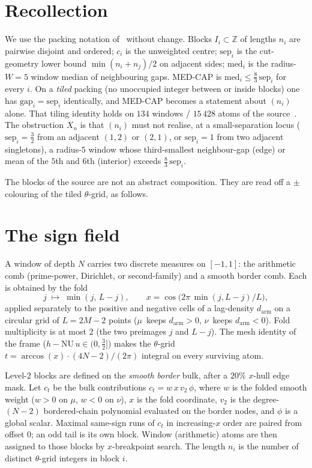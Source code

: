 \documentclass[11pt]{article}
\theoremstyle{remark}
\newcommand{\Z}{\mathbb{Z}}
\begin{document}
\section{Recollection}\label{sec:rec}

We use the packing notation of~\cite{medcap} without change.  Blocks
$I_i\subset\Z$ of lengths $n_i$ are pairwise disjoint and ordered;
$c_i$ is the unweighted centre; $\mathrm{sep}_i$ is the cut-geometry
lower bound $\min(n_i+n_j)/2$ on adjacent sides;
$\mathrm{med}_i$ is the radius-$W=5$ window median of neighbouring
gaps.  MED-CAP is $\mathrm{med}_i\le\tfrac83\,\mathrm{sep}_i$ for every
$i$.  On a \emph{tiled} packing (no unoccupied integer between or
inside blocks) one has $\mathrm{gap}_i=\mathrm{sep}_i$ identically, and
MED-CAP becomes a statement about $(n_i)$ alone.  That tiling identity
holds on $134$ windows / $15\,428$ atoms of the source~\cite{medcap}.
The obstruction $X_n$ is that $(n_i)$ must not realise, at a
small-separation locus
($\mathrm{sep}_i=\tfrac32$ from an adjacent $(1,2)$ or $(2,1)$, or
$\mathrm{sep}_i=1$ from two adjacent singletons), a radius-$5$ window
whose third-smallest neighbour-gap (edge) or mean of the $5$th and
$6$th (interior) exceeds $\tfrac83\,\mathrm{sep}_i$.

The blocks of the source are not an abstract composition.  They are
read off a $\pm$ colouring of the tiled $\theta$-grid, as follows.

\section{The sign field}\label{sec:sign}

A window of depth $N$ carries two discrete measures on $[-1,1]$: the
arithmetic comb (prime-power, Dirichlet, or second-family) and a
smooth border comb.  Each is obtained by the fold
\[
j \;\longmapsto\; \min(j,\,L-j),\qquad
x=\cos\bigl(2\pi\,\min(j,L-j)/L\bigr),
\]
applied separately to the positive and negative cells of a lag-density
$d_{\mathrm{arm}}$ on a circular grid of $L=2M-2$ points
($\mu$~keeps $d_{\mathrm{arm}}>0$, $\nu$~keeps $d_{\mathrm{arm}}<0$).
Fold multiplicity is at most $2$ (the two preimages $j$ and $L-j$).
The mesh identity of the frame ($h-\mathrm{NU}\,u\in(0,\tfrac32]$)
makes the $\theta$-grid
$t=\arccos(x)\cdot(4N-2)/(2\pi)$ integral on every surviving atom.

Level-$2$ blocks are defined on the \emph{smooth border} bulk, after a
$20\%$ $x$-hull edge mask.  Let $c_t$ be the bulk contributions
$c_t=w\,x\,v_2\,\phi$, where $w$ is the folded smooth weight
($w>0$ on $\mu$, $w<0$ on $\nu$), $x$ is the fold coordinate, $v_2$ is
the degree-$(N-2)$ bordered-chain polynomial evaluated on the border
nodes, and $\phi$ is a global scalar.  Maximal same-sign runs of $c_t$
in increasing-$x$ order are paired from offset $0$; an odd tail is its
own block.  Window (arithmetic) atoms are then assigned to those
blocks by $x$-breakpoint search.  The length $n_i$ is the number of
distinct $\theta$-grid integers in block $i$.
\end{document}
